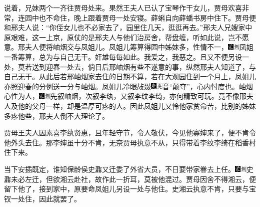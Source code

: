 说着，兄妹两个一齐往贾母处来。果然王夫人已认了宝琴作干女儿，贾母欢喜非常，连园中也不命住，晚上跟着贾母一处安寝。薛蝌自向薛蟠书房中住下。贾母便和邢夫人说：``你侄女儿也不必家去了，园里住几天，逛逛再去。''邢夫人兄嫂家中原艰难，这一上京，原仗的是邢夫人与他们治房舍，帮盘缠，听如此说，岂不愿意。邢夫人便将岫烟交与凤姐儿。凤姐儿筹算得园中姊妹多，性情不一，{\includegraphics[width=3mm]{../Images/00006}\includegraphics[width=3mm]{../Images/00011}\footnotesize \kaishu 凤姐一番筹算，总为与自己无干。奸雄每每如此。我爱之，我恶之。}且又不便另设一处，莫若送到迎春一处去，倘日后邢岫烟有些不遂意的事，纵然邢夫人知道了，与自己无干。从此后若邢岫烟家去住的日期不算，若在大观园住到一个月上，凤姐儿亦照迎春的分例送一分与岫烟。凤姐儿冷眼敁敠{\includegraphics[width=3mm]{../Images/00004}\includegraphics[width=3mm]{../Images/00012}\footnotesize \kaishu 音``颠夺''，心内忖度也。}岫烟心性为人，{\includegraphics[width=3mm]{../Images/00006}\includegraphics[width=3mm]{../Images/00011}\footnotesize \kaishu 先叙岫烟，次叙李纨，又叙李纹李绮，亦何精致可玩。}竟不像邢夫人及他的父母一样，却是温厚可疼的人。因此凤姐儿又怜他家贫命苦，比别的姊妹多疼他些，邢夫人倒不大理论了。

贾母王夫人因素喜李纨贤惠，且年轻守节，令人敬伏，今见他寡婶来了，便不肯令他外头去住。那李婶虽十分不肯，无奈贾母执意不从，只得带着李纹李绮在稻香村住下来。

当下安插既定，谁知保龄侯史鼐又迁委了外省大员，不日要带家眷去上任。{\includegraphics[width=3mm]{../Images/00006}\includegraphics[width=3mm]{../Images/00011}\footnotesize \kaishu 史鼐未必左迁，但欲湘云赴社，故作此一折耳，莫被他混过。}贾母因舍不得湘云，便留下他了，接到家中，原要命凤姐儿另设一处与他住。史湘云执意不肯，只要与宝钗一处住，因此就罢了。

